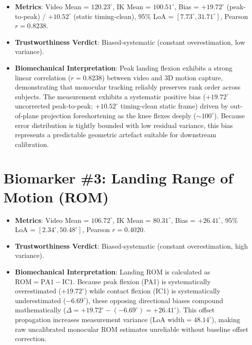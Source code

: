 \begin{itemize}
  \item \textbf{Metrics}: Video Mean = $120.23^\circ$, IK Mean = $100.51^\circ$, Bias = $+19.72^\circ$ (peak-to-peak) / $+10.52^\circ$ (static timing-clean), 95\% LoA = $[7.73^\circ, 31.71^\circ]$, Pearson $r = 0.8238$.
  \item \textbf{Trustworthiness Verdict}: Biased-systematic (constant overestimation, low variance).
  \item \textbf{Biomechanical Interpretation}: Peak landing flexion exhibits a strong linear correlation ($r = 0.8238$) between video and 3D motion capture, demonstrating that monocular tracking reliably preserves rank order across subjects. The measurement exhibits a systematic positive bias ($+19.72^\circ$ uncorrected peak-to-peak; $+10.52^\circ$ timing-clean static frame) driven by out-of-plane projection foreshortening as the knee flexes deeply ($\sim 100^\circ$). Because error distribution is tightly bounded with low residual variance, this bias represents a predictable geometric artefact suitable for downstream calibration.
\end{itemize}



\section{Biomarker \protect\#3: Landing Range of Motion (ROM)}
\label{sec:d-3-biomarker-protect-3-landing-range-of-motion-rom}

\begin{itemize}
  \item \textbf{Metrics}: Video Mean = $106.72^\circ$, IK Mean = $80.31^\circ$, Bias = $+26.41^\circ$, 95\% LoA = $[2.34^\circ, 50.48^\circ]$, Pearson $r = 0.4020$.
  \item \textbf{Trustworthiness Verdict}: Biased-systematic (constant overestimation, high variance).
  \item \textbf{Biomechanical Interpretation}: Landing ROM is calculated as $\text{ROM} = \text{PA1} - \text{IC1}$. Because peak flexion (PA1) is systematically overestimated ($+19.72^\circ$) while contact flexion (IC1) is systematically underestimated ($-6.69^\circ$), these opposing directional biases compound mathematically ($\Delta = +19.72^\circ - (-6.69^\circ) = +26.41^\circ$). This offset propagation increases measurement variance ($\text{LoA} \text{ width} = 48.14^\circ$), making raw uncalibrated monocular ROM estimates unreliable without baseline offset correction.
\end{itemize}



